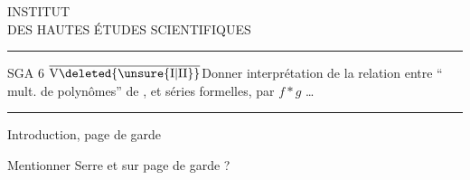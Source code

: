 \begin{center}
INSTITUT\\
DES HAUTES ÉTUDES SCIENTIFIQUES\\[-.4ex]
\rule{1.4cm}{.4pt}
\end{center}

SGA 6 \uline{$\overline{\mathrm{V}\deleted{\unsure{\mathrm{I}|\mathrm{II}}}}$}\qquad Donner interprétation de la relation entre `` mult. de polynômes'' de , et séries formelles, par  $f*g$ \ldots

\noindent\rule{\linewidth}{.4pt}

Introduction, page de garde

Mentionner Serre et  sur page de garde ?
